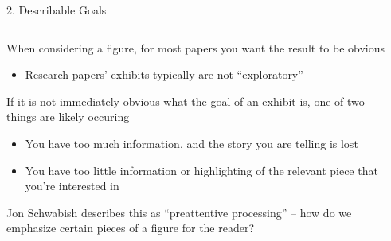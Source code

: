\documentclass[notes,11pt, aspectratio=169]{beamer}
\newenvironment{wideitemize}{\itemize\addtolength{\itemsep}{10pt}}{\enditemize}
\begin{document}
\begin{frame}{2. Describable Goals}
  \begin{columns}[T] %
    \begin{column}{.6\textwidth}
      \begin{wideitemize}
      \item When considering a figure, for most papers you want the
        result to be obvious
        \begin{itemize}
        \item Research papers' exhibits typically are not
          ``exploratory''
        \end{itemize}
      \item If it is not immediately obvious what the goal of an
        exhibit is, one of two things are likely occuring
        \begin{itemize}
        \item You have too much information, and the story you are telling is lost
        \item You have too little information or highlighting of the
          relevant piece that you're interested in
        \end{itemize}
      \item Jon Schwabish describes this as ``preattentive
        processing'' -- how do we emphasize certain pieces of a figure
        for the reader?
      \end{wideitemize}
  \end{column}%
  \hfill%
  \begin{column}{.4\textwidth}
  \end{column}
\end{columns}
\end{frame}
\end{document}
